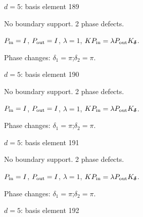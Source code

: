 \vfill
{\footnotesize\texttt{}}
\newpage
{}
{\Large $d=5$: basis element 189}\par
No boundary support. 2 phase defects.
\begin{center}
\end{center}
\vspace{-1mm}
$P_{\rm in}=I$, \quad $P_{\rm out}=I$, \quad $\lambda=1$, \qquad $K P_{\rm in}=\lambda P_{\rm out}K_{\boldsymbol\delta}$.
\par\smallskip\begin{minipage}{.98\linewidth}\small Phase changes: $\delta_{1}=\pi$;\quad $\delta_{2}=\pi$.\end{minipage}
\vfill
{\footnotesize\texttt{}}
\newpage
{}
{\Large $d=5$: basis element 190}\par
No boundary support. 2 phase defects.
\begin{center}
\end{center}
\vspace{-1mm}
$P_{\rm in}=I$, \quad $P_{\rm out}=I$, \quad $\lambda=1$, \qquad $K P_{\rm in}=\lambda P_{\rm out}K_{\boldsymbol\delta}$.
\par\smallskip\begin{minipage}{.98\linewidth}\small Phase changes: $\delta_{1}=\pi$;\quad $\delta_{2}=\pi$.\end{minipage}
\vfill
{\footnotesize\texttt{}}
\newpage
{}
{\Large $d=5$: basis element 191}\par
No boundary support. 2 phase defects.
\begin{center}
\end{center}
\vspace{-1mm}
$P_{\rm in}=I$, \quad $P_{\rm out}=I$, \quad $\lambda=1$, \qquad $K P_{\rm in}=\lambda P_{\rm out}K_{\boldsymbol\delta}$.
\par\smallskip\begin{minipage}{.98\linewidth}\small Phase changes: $\delta_{1}=\pi$;\quad $\delta_{2}=\pi$.\end{minipage}
\vfill
{\footnotesize\texttt{}}
\newpage
{}
{\Large $d=5$: basis element 192}\par
